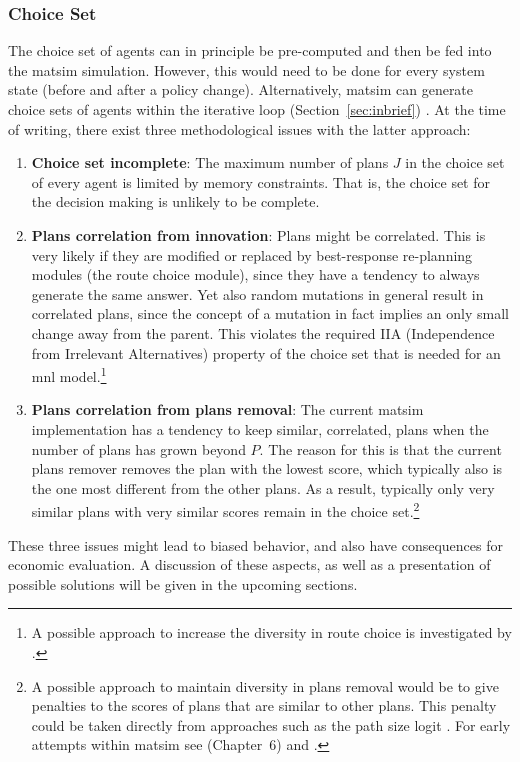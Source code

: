 \subsubsection{Choice Set}
The choice set of agents can in principle be pre-computed and then be fed into the \acrshort{matsim} simulation. However, this would need to be done for every system state (\eg before and after a policy change).
%
Alternatively, \acrshort{matsim} can generate choice sets of agents within the iterative loop (Section~\ref{sec:inbrief})
%
%
. At the time of writing, there exist three methodological issues with the latter approach:
%
\begin{enumerate}\styleEnumerate
\item \textbf{Choice set incomplete}: The maximum number of plans $J$ in the choice set of every agent is limited by memory constraints. That is, the choice set for the decision making is unlikely to be complete.
%
\item \textbf{Plans correlation from innovation}: Plans might be correlated. This is very likely if they are modified or replaced by best-response re-planning modules (\eg the route choice module), since they have a tendency to always generate the same answer. Yet also random mutations in general result in correlated plans, since the concept of a mutation in fact implies an only small change away from the parent.  This violates the required IIA (Independence from Irrelevant Alternatives) 
property of the choice set that is needed for an \gls{mnl} 
model.\footnote{%
%
A possible approach to increase the diversity in route choice is investigated by \citet{NagelKickhoeferJoubert2014HeterogeneousVoTsPROCEDIA}.
%
}

\item \textbf{Plans correlation from plans removal}: The current \acrshort{matsim} implementation has a tendency to keep similar, \ie  correlated, plans when the number of plans has grown beyond $P$.  The reason for this is that the current plans remover removes the plan with the lowest score, which typically also is the one most different from the other plans.  As a result, typically only very similar plans with very similar scores remain in the choice set.\footnote{%
%
A possible approach to maintain diversity in plans removal would be to give penalties to the scores of plans that are similar to other plans.  This penalty could be taken directly from approaches such as the path size logit \citep{DaganzoSheffi1977SUE,FrejingerBierlaire2007PathSizeLogit}.  For early attempts within \acrshort{matsim} see \cite{Grether2014PhD} (Chapter~6) and \cite{NeumannEtAlPassengerArrivalPatterns}.
%
}


\end{enumerate}
%
These three issues might lead to biased behavior, and also have consequences for economic evaluation. A discussion of these aspects, as well as a presentation of possible solutions will be given in the upcoming sections.

